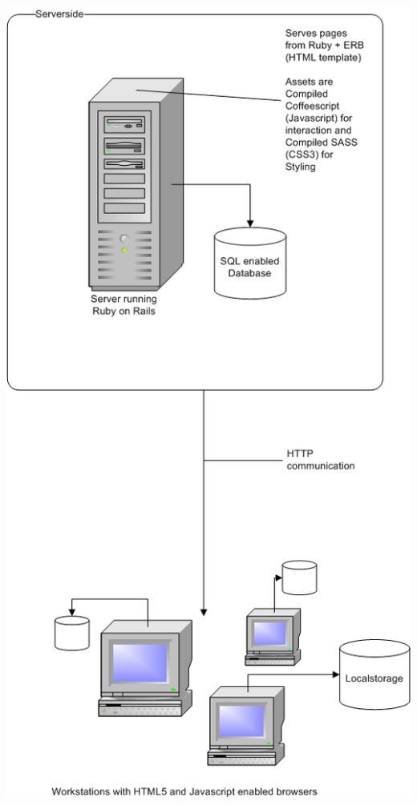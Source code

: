 \documentclass{report}
\begin{document}
			\includegraphics[scale=0.8]{EAD.png} 
			
\end{document}
